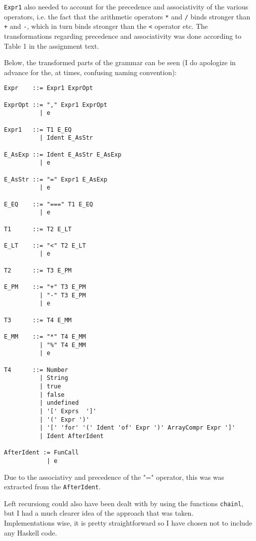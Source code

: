 \documentclass[a4paper]{article}
\begin{document}
\texttt{Expr1} also needed to account for the precedence and associativity of the various operators, i.e. the fact that the arithmetic operators \texttt{*} and \texttt{/} binds stronger than \texttt{+} and \texttt{-}, which in turn binds stronger than the \texttt{<} operator etc. The transformations regarding precedence and associativity was done according to Table 1 in the assignment text.

Below, the transformed parts of the grammar can be seen (I do apologize in advance for the, at times, confusing naming convention):
\begin{verbatim}
Expr    ::= Expr1 ExprOpt

ExprOpt ::= "," Expr1 ExprOpt
          | e

Expr1   ::= T1 E_EQ
          | Ident E_AsStr

E_AsExp ::= Ident E_AsStr E_AsExp
          | e

E_AsStr ::= "=" Expr1 E_AsExp
          | e

E_EQ    ::= "===" T1 E_EQ
          | e

T1      ::= T2 E_LT

E_LT    ::= "<" T2 E_LT
          | e

T2      ::= T3 E_PM

E_PM    ::= "+" T3 E_PM
          | "-" T3 E_PM
          | e

T3      ::= T4 E_MM

E_MM    ::= "*" T4 E_MM
          | "%" T4 E_MM
          | e

T4      ::= Number
          | String
          | true
          | false
          | undefined
          | '[' Exprs  ']'
          | '(' Expr ')'
          | '[' 'for' '(' Ident 'of' Expr ')' ArrayCompr Expr ']'
          | Ident AfterIdent

AfterIdent := FunCall
            | e
\end{verbatim}
Due to the associativy and precedence of the "=" operator, this was was extracted from the \texttt{AfterIdent}.

Left recursiong could also have been dealt with by using the functions \texttt{chainl}, but I had a much clearer idea of the approach that was taken. \\
Implementations wise, it is pretty straightforward so I have chosen not to include any Haskell code.
\end{document}
